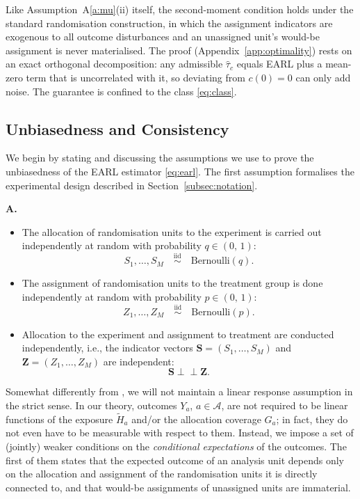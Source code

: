 \documentclass[sigconf,nonacm]{acmart}
\newcounter{assumption}
\newenvironment{assumption}{\refstepcounter{assumption}\par\medskip\noindent\textbf{A\theassumption.}\enspace}{\par\medskip}
\newcommand{\iidsim}{{\stackrel{\mathrm{iid}}{\sim}}}
\newcommand{\ind}{\perp\!\!\!\perp}
\begin{document}
Like Assumption~A\ref{a:mu}(ii) itself, the second-moment condition holds under the standard randomisation construction, in which the assignment indicators are exogenous to all outcome disturbances and an unassigned unit's would-be assignment is never materialised. The proof (Appendix~\ref{app:optimality}) rests on an exact orthogonal decomposition: any admissible $\hat\tau_c$ equals EARL plus a mean-zero term that is uncorrelated with it, so deviating from $c(0)=0$ can only add noise. The guarantee is confined to the class \eqref{eq:class}.

\subsection{Unbiasedness and Consistency}\label{subsec:analysis}

We begin by stating and discussing the assumptions we use to prove the unbiasedness of the EARL estimator \eqref{eq:earl}. The first assumption formalises the experimental design described in Section~\ref{subsec:notation}.

\begin{assumption}\label{a:1}
\begin{itemize}
\item The allocation of randomisation units to the experiment is carried out independently at random with probability $q\in(0,\,1)$:
\[
    S_1,\ldots,S_M \quad \iidsim \quad \mathrm{Bernoulli}(q).
\]
\item
The assignment of randomisation units to the treatment group is done independently at random with probability $p\in(0,\,1)$:
\[
    Z_1,\ldots,Z_M \quad \iidsim \quad \mathrm{Bernoulli}(p).
\]
\item
Allocation to the experiment and assignment to treatment are conducted independently, i.e., the indicator vectors
$\mathbf S=(S_1,\ldots,S_M)$ and $\mathbf Z=(Z_1,\allowbreak\ldots,\allowbreak Z_M)$ are independent:
\[
    \mathbf S \ind \mathbf Z.
\]
\end{itemize}
\end{assumption}

Somewhat differently from \cite{harshaw2023erl}, we will not maintain a linear response assumption in the strict sense. In our theory, outcomes $Y_a$, $a\in\mathcal A$, are not required to be linear functions of the exposure $\tilde H_a$ and/or the allocation coverage $G_a$; in fact, they do not even have to be measurable with respect to them. Instead, we impose a set of (jointly) weaker conditions on the \emph{conditional expectations} of the outcomes. The first of them states that the expected outcome of an analysis unit depends only on the allocation and assignment of the randomisation units it is directly connected to, and that would-be assignments of unassigned units are immaterial.
\end{document}
